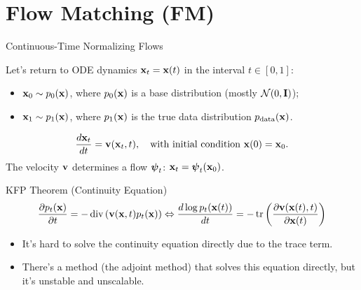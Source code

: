 \documentclass{beamer}
\begin{document}
\section{Flow Matching (FM)}
\begin{frame}{Continuous-Time Normalizing Flows}

	Let's return to ODE dynamics $\mathbf{x}_t = \mathbf{x}(t)$ in the interval $t \in [0, 1]$:
	\begin{itemize}
		\item $\mathbf{x}_0 \sim p_0(\mathbf{x})$, where $p_0(\mathbf{x})$ is a base distribution (mostly $\mathcal{N}(0, \mathbf{I})$);
		\item $\mathbf{x}_1 \sim p_1(\mathbf{x})$, where $p_1(\mathbf{x})$ is the true data distribution $p_{\text{data}}(\mathbf{x})$.
	\end{itemize}
	\[
		\frac{d \mathbf{x}_t}{dt} = \mathbf{v} (\mathbf{x}_t, t),  \quad \text{with initial condition } \mathbf{x}(0) = \mathbf{x}_0.
	\]
	The velocity $\mathbf{v}$ determines a flow $\boldsymbol{\psi}_t$: $\mathbf{x}_t = \boldsymbol{\psi}_t(\mathbf{x}_0)$.
    \eqpause
	\begin{block}{KFP Theorem (Continuity Equation)}
		\vspace{-0.5cm}
		\[
			\frac{\partial p_t(\mathbf{x})}{\partial t} = - \operatorname{div}\left(\mathbf{v}(\mathbf{x}, t) p_t(\mathbf{x})\right) \Leftrightarrow \frac{d \log p_t(\mathbf{x}(t))}{d t} = - \operatorname{tr} \left( \frac{\partial \mathbf{v}(\mathbf{x}(t), t)}{\partial \mathbf{x}(t)} \right)
		\]
		\vspace{-0.5cm}
	\end{block}
    \eqpause
	\begin{itemize}
		\item It's hard to solve the continuity equation directly due to the trace term.
		\item There's a method (the adjoint method) that solves this equation directly, but it's unstable and unscalable.
	\end{itemize}
\end{frame}
\end{document}
